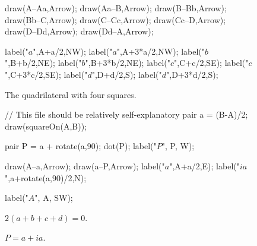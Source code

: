 \documentclass[../textbook.tex]{subfiles}
\begin{document}
\begin{figure}[h]
\begin{center}
\begin{minipage}[b]{0.35\textwidth}
\begin{center}
\begin{minipage}[b]{\textwidth}
\begin{asy}[width=0.6\textwidth]
						draw(A--Aa,Arrow);
						draw(Aa--B,Arrow);
						draw(B--Bb,Arrow);
						draw(Bb--C,Arrow);
						draw(C--Cc,Arrow);
						draw(Cc--D,Arrow);
						draw(D--Dd,Arrow);
						draw(Dd--A,Arrow);

						label("$a$",A+a/2,NW);
						label("$a$",A+3*a/2,NW);
						label("$b$",B+b/2,NE);
						label("$b$",B+3*b/2,NE);
						label("$c$",C+c/2,SE);
						label("$c$",C+3*c/2,SE);
						label("$d$",D+d/2,S);
						label("$d$",D+3*d/2,S);

					\end{asy}
				\end{minipage}
			\end{center}
			\vspace*{-2\baselineskip}
			\begin{center}
				\begin{minipage}[t]{\textwidth}
					\caption{The quadrilateral with four squares.}
					\label{fig:quad_square}
				\end{minipage}
			\end{center}

			\begin{center}
				\begin{minipage}[b]{\textwidth}
					\centering
					\begin{asy}[width=0.6\textwidth]
						// This file should be relatively self-explanatory
						pair a = (B-A)/2;
						draw(squareOn(A,B));

						pair P = a + rotate(a,90);
						dot(P);
						label("$P$", P, W);

						draw(A--a,Arrow);
						draw(a--P,Arrow);
						label("$a$",A+a/2,E);
						label("$ia$",a+rotate(a,90)/2,N);

						label("$A$", A, SW);
					\end{asy}
				\end{minipage}
			\end{center}
		\end{minipage}
	\end{center}
	\vspace*{-2\baselineskip}
	\begin{center}
		\begin{minipage}[t]{0.55\textwidth}
			\caption{$2(a+b+c+d)=0$.}
			\label{fig:add_to_0}
		\end{minipage}
		\hfill
		\begin{minipage}[t]{0.35\textwidth}
			\caption{$P=a+ia$.}
			\label{fig:p_def_on_a}
		\end{minipage}
	\end{center}
	\vspace*{-2\baselineskip}
\end{figure}
\end{document}
